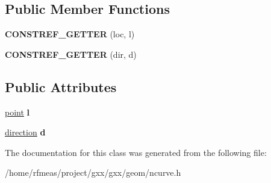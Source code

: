 \subsection*{Public Member Functions}
\begin{DoxyCompactItemize}
\item 
{\bfseries C\+O\+N\+S\+T\+R\+E\+F\+\_\+\+G\+E\+T\+T\+ER} (loc, l)\hypertarget{classgxx_1_1ngeom_1_1infinity__line_af03e98f06ae86fbd6cfb097300a588cd}{}\label{classgxx_1_1ngeom_1_1infinity__line_af03e98f06ae86fbd6cfb097300a588cd}

\item 
{\bfseries C\+O\+N\+S\+T\+R\+E\+F\+\_\+\+G\+E\+T\+T\+ER} (dir, d)\hypertarget{classgxx_1_1ngeom_1_1infinity__line_aeb9dffa1ad6457ae09ea68a5d7a4b643}{}\label{classgxx_1_1ngeom_1_1infinity__line_aeb9dffa1ad6457ae09ea68a5d7a4b643}

\end{DoxyCompactItemize}
\subsection*{Public Attributes}
\begin{DoxyCompactItemize}
\item 
\hyperlink{classgxx_1_1ngeom_1_1point}{point} {\bfseries l}\hypertarget{classgxx_1_1ngeom_1_1infinity__line_aa4665a47959195caf12104a1c2e62433}{}\label{classgxx_1_1ngeom_1_1infinity__line_aa4665a47959195caf12104a1c2e62433}

\item 
\hyperlink{classgxx_1_1ngeom_1_1direction}{direction} {\bfseries d}\hypertarget{classgxx_1_1ngeom_1_1infinity__line_ab4dd14840bd401063d2b9fd657455c37}{}\label{classgxx_1_1ngeom_1_1infinity__line_ab4dd14840bd401063d2b9fd657455c37}

\end{DoxyCompactItemize}


The documentation for this class was generated from the following file\+:\begin{DoxyCompactItemize}
\item 
/home/rfmeas/project/gxx/gxx/geom/ncurve.\+h\end{DoxyCompactItemize}
